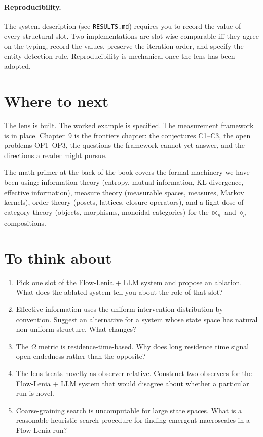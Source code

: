 \paragraph{Reproducibility.} The system description (see
\texttt{RESULTS.md}) requires you to record the value of every
structural slot. Two implementations are slot-wise comparable iff they
agree on the typing, record the values, preserve the iteration order,
and specify the entity-detection rule. Reproducibility is mechanical
once the lens has been adopted.

\section{Where to next}

The lens is built. The worked example is specified. The measurement
framework is in place. Chapter~9 is the frontiers chapter: the
conjectures C1--C3, the open problems OP1--OP3, the questions the
framework cannot yet answer, and the directions a reader might pursue.

The math primer at the back of the book covers the formal machinery
we have been using: information theory (entropy, mutual information,
KL divergence, effective information), measure theory (measurable
spaces, measures, Markov kernels), order theory (posets, lattices,
closure operators), and a light dose of category theory (objects,
morphisms, monoidal categories) for the $\boxtimes_\kappa$ and
$\diamond_\rho$ compositions.

\section*{To think about}

\begin{enumerate}
  \item Pick one slot of the Flow-Lenia + LLM system and propose an
    ablation. What does the ablated system tell you about the role
    of that slot?
  \item Effective information uses the uniform intervention
    distribution by convention. Suggest an alternative for a system
    whose state space has natural non-uniform structure. What changes?
  \item The $\Omega$ metric is residence-time-based. Why does long
    residence time signal open-endedness rather than the opposite?
  \item The lens treats novelty as observer-relative. Construct two
    observers for the Flow-Lenia + LLM system that would disagree
    about whether a particular run is novel.
  \item Coarse-graining search is uncomputable for large state
    spaces. What is a reasonable heuristic search procedure for
    finding emergent macroscales in a Flow-Lenia run?
\end{enumerate}
